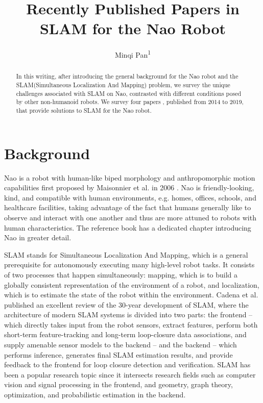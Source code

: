 \documentclass[11pt]{amsart}
\title{Recently Published Papers in SLAM for the Nao Robot}
\author{Minqi Pan\textsuperscript{1}}
\begin{document}
\begin{abstract}
In this writing, after introducing the general background for the Nao robot and the SLAM(Simultaneous Localization And Mapping) problem, we survey the unique challenges associated with SLAM on Nao, contrasted with different conditions posed by other non-humanoid robots. We survey four papers \cite{lahemer2019adaptive}\cite{piperakis2019}\cite{hornung2014monte}\cite{hornung2014humanoid}, published from 2014 to 2019, that provide solutions to SLAM for the Nao robot.
\end{abstract}

\maketitle


\section{Background}

Nao is a robot with human-like biped morphology and anthropomorphic motion capabilities first proposed by Maisonnier et al. in 2006 \cite{gouaillier2009mechatronic}. Nao is friendly-looking, kind, and compatible with human environments, e.g. homes, offices, schools, and healthcare facilities, taking advantage of the fact that humans generally like to observe and interact with one another and thus are more attuned to robots with human characteristics. The reference book \cite{goswami2019humanoid} has a dedicated chapter introducing Nao in greater detail.

SLAM stands for Simultaneous Localization And Mapping, which is a general prerequisite for autonomously executing many high-level robot tasks. It consists of two processes that happen simultaneously: mapping, which is to build a globally consistent representation of the environment of a robot, and localization, which is to estimate the state of the robot within the environment. Cadena et al. \cite{cadena2016past} published an excellent review of the 30-year development of SLAM, where the architecture of modern SLAM systems is divided into two parts: the frontend -- which directly takes input from the robot sensors, extract features, perform both short-term feature-tracking and long-term loop-closure data associations, and supply amenable sensor models to the backend -- and the backend -- which performs inference, generates final SLAM estimation results, and provide feedback to the frontend for loop closure detection and verification. SLAM has been a popular research topic since it intersects research fields such as computer vision and signal processing in the frontend, and geometry, graph theory, optimization, and probabilistic estimation in the backend.
\end{document}
